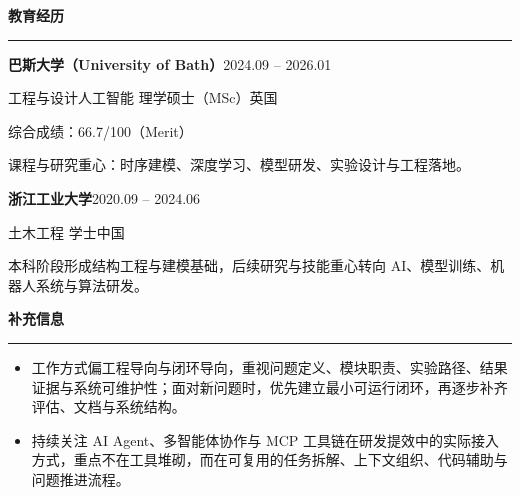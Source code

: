 \documentclass[UTF8,11pt,a4paper,fontset=fandol]{ctexart}
\newcommand{\CVSection}[1]{%
  \vspace{7pt}%
  {\large\bfseries #1}\par
  \vspace{4pt}\hrule\vspace{5pt}%
}
\newcommand{\EntryHeader}[4]{%
  {\bfseries #1}\hfill {#2}\par
  {\color{black!75}#3}\hfill {\color{black!75}#4}\par
}
\newcommand{\Muted}[1]{{\color{black!70}#1}}
\begin{document}
\CVSection{教育经历}
\EntryHeader{巴斯大学（University of Bath）}{2024.09 -- 2026.01}{工程与设计人工智能 理学硕士（MSc）}{英国}
综合成绩：66.7/100（Merit）\par
\Muted{课程与研究重心：时序建模、深度学习、模型研发、实验设计与工程落地。}\par

\vspace{4pt}
\EntryHeader{浙江工业大学}{2020.09 -- 2024.06}{土木工程 学士}{中国}
\Muted{本科阶段形成结构工程与建模基础，后续研究与技能重心转向 AI、模型训练、机器人系统与算法研发。}\par

\CVSection{补充信息}
\begin{itemize}
  \item 工作方式偏工程导向与闭环导向，重视问题定义、模块职责、实验路径、结果证据与系统可维护性；面对新问题时，优先建立最小可运行闭环，再逐步补齐评估、文档与系统结构。
  \item 持续关注 AI Agent、多智能体协作与 MCP 工具链在研发提效中的实际接入方式，重点不在工具堆砌，而在可复用的任务拆解、上下文组织、代码辅助与问题推进流程。
\end{itemize}
\end{document}
